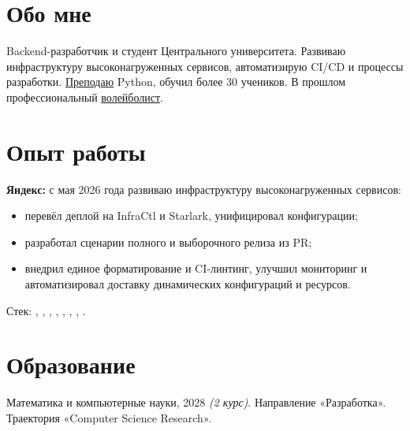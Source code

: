 \documentclass[margin,line]{resume}
\begin{document}
\begin{resume}

  \section{\mysidestyle Обо мне}
  Backend-разработчик и студент Центрального университета.
  Развиваю инфраструктуру высоконагруженных сервисов, автоматизирую
  CI/CD и процессы разработки.
  \href{https://alchemmist.xyz/teach/individual-education/}{Преподаю}
  Python, обучил более 30 учеников. В прошлом профессиональный
  \href{https://alchemmist.github.io/CV/attachments/sport.pdf}{волейболист}.

  \section{\mysidestyle Опыт работы}\vspace{0.7mm}
  \textbf{Яндекс:} с мая 2026 года развиваю инфраструктуру
  высоконагруженных сервисов:
  \begin{itemize}[leftmargin=4mm, itemsep=0pt, topsep=1pt, parsep=0pt]
    \item перевёл деплой на InfraCtl и Starlark, унифицировал конфигурации;
    \item разработал сценарии полного и выборочного релиза из PR;
    \item внедрил единое форматирование и CI-линтинг, улучшил мониторинг и
      автоматизировал доставку динамических конфигураций и ресурсов.
  \end{itemize}\vspace{-2mm}
  Стек: , , ,
  , , ,
  , .

  {\let\makelabel\descriptionlabel
    \renewcommand*\descriptionlabel[1]{\hspace\labelsep\normalfont #1}
    \section{\mysidestyle Образование}\vspace{0.7mm}
    \begin{description}[leftmargin=0pt, itemindent=*, itemsep=8pt]
      \item[\href{https://cu.ru}{Центральный университет}.]
        Математика и компьютерные науки, 2028 \textit{(2 курс)}.
        Направление «Разработка». Траектория «Computer Science Research».


\end{description}}
\end{resume}
\end{document}
